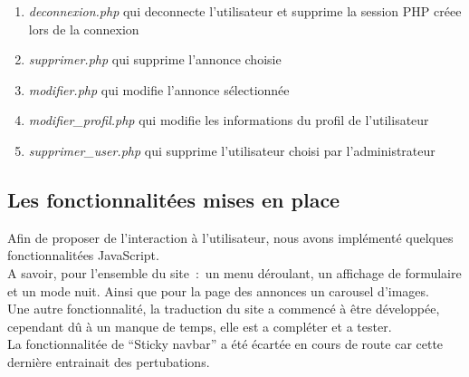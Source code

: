 \documentclass[11pt,a4paper]{article}
\begin{document}
\begin{itemize}
    \begin{enumerate}
        \item \emph{deconnexion.php} qui deconnecte l'utilisateur et supprime la session PHP créee lors de la connexion
        \item \emph{supprimer.php} qui supprime l'annonce choisie
        \item \emph{modifier.php} qui modifie l'annonce sélectionnée
        \item \emph{modifier\_profil.php} qui modifie les informations du profil de l'utilisateur
        \item \emph{supprimer\_user.php} qui supprime l'utilisateur choisi par l'administrateur
    \end{enumerate}
\end{itemize}

\subsection{Les fonctionnalitées mises en place}
Afin de proposer de l'interaction à l'utilisateur, nous avons implémenté quelques fonctionnalitées JavaScript.\\
A savoir, pour l'ensemble du site~:~un menu déroulant, un affichage de formulaire et un mode nuit. Ainsi que pour la page des annonces un carousel d'images.\\
Une autre fonctionnalité, la traduction du site a commencé à être développée, cependant dû à un manque de temps, elle est a compléter et a tester.\\
La fonctionnalitée de ``Sticky navbar'' a été écartée en cours de route car cette dernière entrainait des pertubations.

\newpage
\end{document}
